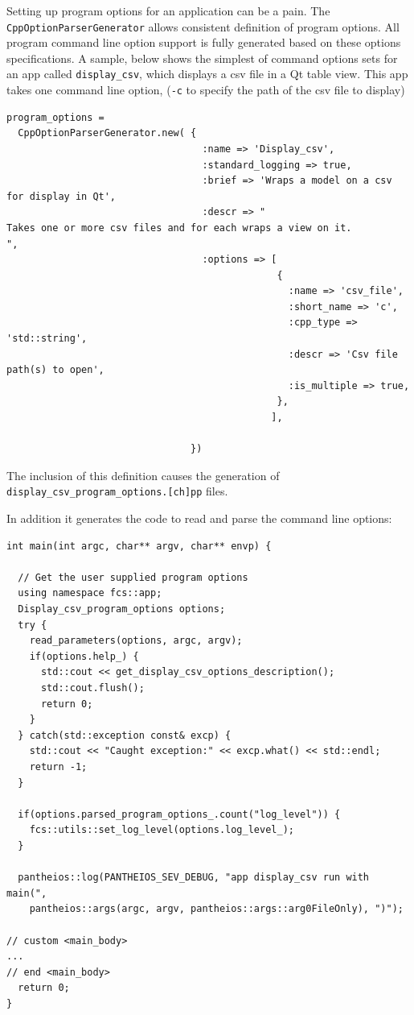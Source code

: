 \documentclass[11pt]{article}
\begin{document}
  Setting up program options for an application can be a pain. The
  \texttt{CppOptionParserGenerator} allows consistent definition of program
  options. All program command line option support is fully generated
  based on these options specifications. A sample, below shows the
  simplest of command options sets for an app called \texttt{display\_csv},
  which displays a csv file in a Qt table view. This app takes one
  command line option, (\texttt{-c} to specify the path of the csv file to
  display)


\lstset{language=Ruby}
\begin{lstlisting}
program_options = 
  CppOptionParserGenerator.new( {
                                  :name => 'Display_csv',
                                  :standard_logging => true,
                                  :brief => 'Wraps a model on a csv for display in Qt',
                                  :descr => " 
Takes one or more csv files and for each wraps a view on it.
",
                                  :options => [
                                               { 
                                                 :name => 'csv_file',
                                                 :short_name => 'c',
                                                 :cpp_type => 'std::string',
                                                 :descr => 'Csv file path(s) to open',
                                                 :is_multiple => true,
                                               },
                                              ],

                                })
\end{lstlisting}



  The inclusion of this definition causes the generation of
  \texttt{display\_csv\_program\_options.[ch]pp} files.

  In addition it generates the code to read and parse the command line
  options:


\lstset{language=C++}
\begin{lstlisting}
int main(int argc, char** argv, char** envp) {

  // Get the user supplied program options
  using namespace fcs::app;
  Display_csv_program_options options;
  try {
    read_parameters(options, argc, argv);
    if(options.help_) {
      std::cout << get_display_csv_options_description();
      std::cout.flush();
      return 0;
    }
  } catch(std::exception const& excp) {
    std::cout << "Caught exception:" << excp.what() << std::endl;
    return -1;
  }

  if(options.parsed_program_options_.count("log_level")) {
    fcs::utils::set_log_level(options.log_level_);
  }

  pantheios::log(PANTHEIOS_SEV_DEBUG, "app display_csv run with main(", 
    pantheios::args(argc, argv, pantheios::args::arg0FileOnly), ")");
  
// custom <main_body>
...
// end <main_body> 
  return 0;
}
\end{lstlisting}
\end{document}
